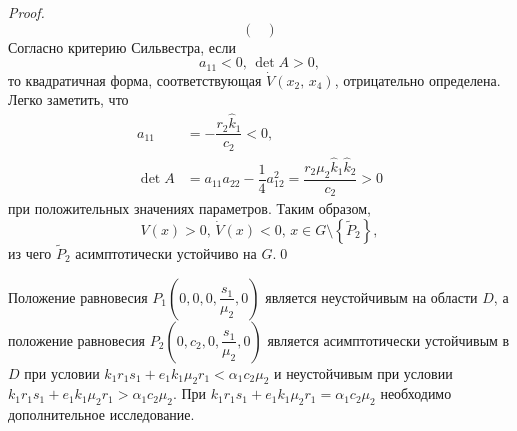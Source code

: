 \documentclass[14pt,a4paper]{extarticle}
\begin{document}
\begin{proof}
\[\begin{pmatrix}
		\end{pmatrix}\]
		Согласно критерию Сильвестра, если 
		\[a_{11}<0,\, \det A>0,\]
		то квадратичная форма, соответствующая $\dot{V}(x_2,\, x_4)$, отрицательно определена. Легко заметить, что 
		\begin{align*}
			a_{11} &= -\dfrac{r_2\hat{k}_1}{c_2}<0,\\
			\det A &= a_{11}a_{22}-\dfrac{1}{4}a^2_{12} = \dfrac{r_2\mu_2\hat{k}_1\hat{k}_2}{c_2}>0
		\end{align*}
		при положительных значениях параметров. Таким образом, 
		\[V(x)>0,\, \dot{V}(x)<0,\, x\in G\setminus\left\{\tilde{P}_2\right\},\]
		из чего $\tilde{P}_2$ асимптотически устойчиво на $G$.\qed
	\end{proof}
	
	\begin{theorem}
		Положение равновесия $P_1\left(0,0,0,\dfrac{s_1}{\mu_2},0\right)$ является неустойчивым на области $D$, а положение равновесия $P_2\left(0,c_2,0,\dfrac{s_1}{\mu_2},0\right)$ является асимптотически устойчивым в $D$ при условии $k_1r_1s_1 + e_1k_1\mu_2r_1< \alpha_1c_2\mu_2$ и неустойчивым при условии $k_1r_1s_1 + e_1k_1\mu_2r_1>\alpha_1c_2\mu_2$. При $k_1r_1s_1 + e_1k_1\mu_2r_1 = \alpha_1c_2\mu_2$ необходимо дополнительное исследование.
	\end{theorem}
	
\end{document}
